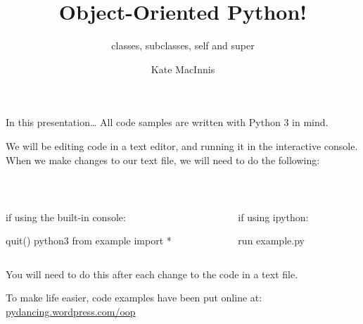 \documentclass[aspectratio=169] {beamer}
\title[OOP!]{Object-Oriented Python!}
\subtitle{classes, subclasses, self and super}
\author{Kate MacInnis}
\institute{PyLadies-ATX Tech Talk\\July 18, 2016}
\date{}
\begin{document}
\begin{frame}
  \maketitle
\end{frame}






\begin{frame}[fragile]{In this presentation\dots}
  All code samples are written with Python 3 in mind.
  
  \bigskip
  
  
  We will be editing code in a text editor, and running it in the interactive console. When we make changes to our text file, we will need to do the following:
  
  ~\hfill
  \begin{columns}
    \begin{column}[t]{.4\textwidth}
      {\small if using the built-in console:}
      \begin{codeblock}
        quit()
        python3
        from example import *
      \end{codeblock}
    \end{column}
   
    \begin{column}[t]{.4\textwidth}
      {\small if using ipython:}
      \begin{codeblock}
        run example.py
      \end{codeblock}
    \end{column}
  \end{columns}
  
  \bigskip
  
  
  You will need to do this after each change to the code in a text file.
  
  To make life easier, code examples have been put online at:
  \url{pydancing.wordpress.com/oop}
  
\end{frame}
\end{document}
